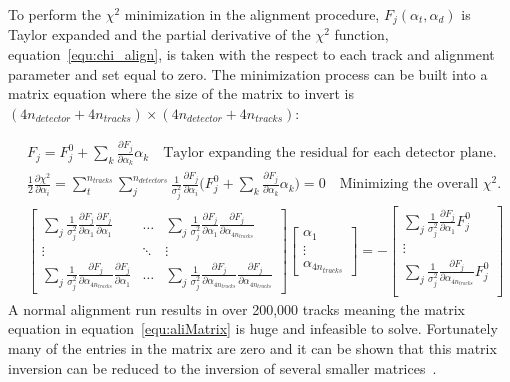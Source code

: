 To perform the $\chi^2$ minimization in the alignment procedure,
$F_j(\alpha_t, \alpha_d)$ is Taylor expanded and the partial
derivative of the $\chi^2$ function, equation~\ref{equ:chi_align}, is
taken with the respect to each track and alignment parameter and set
equal to zero.  The minimization process can be built into a matrix
equation where the size of the matrix to invert is
$(4n_{detector}+4n_{tracks})\times(4n_{detector}+4n_{tracks})$: \par
%
\begin{subequations}
  \begin{align}
    &F_j = F_j^0 + \sum_k \frac{\partial F_j}{\partial
      \alpha_k}\alpha_k \quad \text{Taylor expanding the residual for
      each detector plane.} \label{equ:F_taylor}\\ &\frac{1}{2}
    \frac{\partial \chi ^2}{\partial \alpha_i} = \sum
    _{t}^{n_{tracks}} \sum_j ^{n_{detectors}}\frac{1}{\sigma_j
      ^2}\frac{\partial F_j}{\partial \alpha_i}\Big ( F_j^0 + \sum_k
    \frac{\partial F_j}{\partial \alpha_k}\alpha_k \Big ) = 0 \quad
    \text{Minimizing the overall $\chi^2$.}\\ & \begin{bmatrix} \sum_j
      \frac{1}{\sigma^2_j}\frac{\partial F_j}{\partial
        \alpha_1}\frac{\partial F_j}{\partial \alpha_1} & \dots &
      \sum_j \frac{1}{\sigma^2_j}\frac{\partial F_j}{\partial
        \alpha_1}\frac{\partial F_j}{\partial \alpha_{4n_{tracks}}}
      \\ \vdots & \ddots & \vdots\\ \sum_j
      \frac{1}{\sigma^2_j}\frac{\partial F_j}{\partial
        \alpha_{4n_{tracks}}}\frac{\partial F_j}{\partial \alpha_1} &
      \dots & \sum_j \frac{1}{\sigma^2_j}\frac{\partial F_j}{\partial
        \alpha_{4n_{tracks}}}\frac{\partial F_j}{\partial
        \alpha_{4n_{tracks}}}
      \end{bmatrix}
    \begin{bmatrix}
      \alpha_1 \\ \vdots \\ \alpha_{4n_{tracks}}
    \end{bmatrix}
    = -
    \begin{bmatrix}
      \sum_j \frac{1}{\sigma^2_j}\frac{\partial F_j}{\partial
        \alpha_1} F_j^0 \\ \vdots \\ \sum_j
      \frac{1}{\sigma^2_j}\frac{\partial F_j}{\partial
        \alpha_{4n_{tracks}}} F_j^0 \\
    \end{bmatrix} \label{equ:aliMatrix}
  \end{align}
  \label{equ:Alignment}
\end{subequations}
A normal alignment run results in over 200,000 tracks meaning the
matrix equation in equation~\ref{equ:aliMatrix} is huge and infeasible
to solve.  Fortunately many of the entries in the matrix are zero and
it can be shown that this matrix inversion can be reduced to the
inversion of several smaller matrices~\cite{matrix_inv}.  \par

